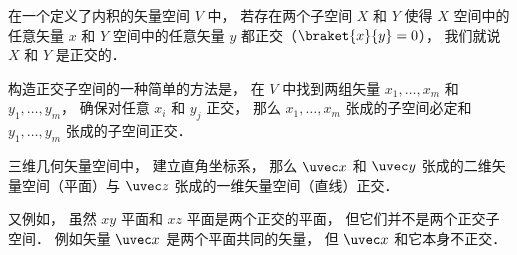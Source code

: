 

在一个定义了内积的矢量空间 $V$ 中， 若存在两个子空间 $X$ 和 $Y$ 使得 $X$ 空间中的任意矢量 $x$ 和 $Y$ 空间中的任意矢量 $y$ 都正交（$\braket{x}{y} = 0$）， 我们就说 $X$ 和 $Y$ 是正交的．

构造正交子空间的一种简单的方法是， 在 $V$ 中找到两组矢量 $x_1, \dots, x_m$ 和 $y_1, \dots, y_m$， 确保对任意 $x_i$ 和 $y_j$ 正交， 那么 $x_1, \dots, x_m$ 张成的子空间必定和 $y_1, \dots, y_m$ 张成的子空间正交．

\begin{example}{}
三维几何矢量空间中， 建立直角坐标系， 那么 $\uvec x$ 和 $\uvec y$ 张成的二维矢量空间（平面）与 $\uvec z$ 张成的一维矢量空间（直线）正交．

又例如， 虽然 $xy$ 平面和 $xz$ 平面是两个正交的平面， 但它们并不是两个正交子空间． 例如矢量 $\uvec x$ 是两个平面共同的矢量， 但 $\uvec x$ 和它本身不正交．
\end{example}

